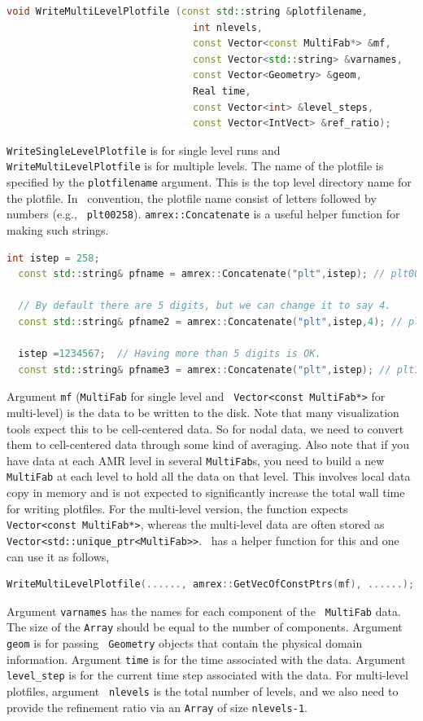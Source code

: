 {{\begin{lstlisting}[language=cpp]
  void WriteMultiLevelPlotfile (const std::string &plotfilename,
                                int nlevels,
                                const Vector<const MultiFab*> &mf,
                                const Vector<std::string> &varnames,
                                const Vector<Geometry> &geom,
                                Real time,
                                const Vector<int> &level_steps,
                                const Vector<IntVect> &ref_ratio);
\end{lstlisting}
{\tt WriteSingleLevelPlotfile} is for single level runs and {\tt
WriteMultiLevelPlotfile} is for multiple levels.  The name of the
plotfile is specified by the {\tt plotfilename} argument.  This is the
top level directory name for the plotfile.  In \amrex\ convention, the
plotfile name consist of letters followed by numbers (e.g., {\tt
plt00258}).  {\tt amrex::Concatenate} is a useful helper function for
making such strings.
\begin{lstlisting}[language=cpp]
  int istep = 258;
  const std::string& pfname = amrex::Concatenate("plt",istep); // plt00258

  // By default there are 5 digits, but we can change it to say 4.
  const std::string& pfname2 = amrex::Concatenate("plt",istep,4); // plt0258  

  istep =1234567;  // Having more than 5 digits is OK.
  const std::string& pfname3 = amrex::Concatenate("plt",istep); // plt12344567
\end{lstlisting}
Argument {\tt mf} ({\tt MultiFab} for single level and {\tt
  Vector<const MultiFab*>} for multi-level) is the data to be written
to the disk.  Note that many visualization tools expect this to be
cell-centered data.  So for nodal data, we need to convert them to
cell-centered data through some kind of averaging.  Also note that if
you have data at each AMR level in several {\tt MultiFab}s, you need
to build a new {\tt MultiFab} at each level to hold all the data on
that level.  This involves local data copy in memory and is not
expected to significantly increase the total wall time for writing
plotfiles.  For the multi-level version, the function expects {\tt
  Vector<const MultiFab*>}, whereas the multi-level data are often
stored as {\tt Vector<std::unique\_ptr<MultiFab>>}.  \amrex\ has a
helper function for this and one can use it as follows,
\begin{lstlisting}[language=cpp]
   WriteMultiLevelPlotfile(......, amrex::GetVecOfConstPtrs(mf), ......);
\end{lstlisting}
Argument {\tt varnames} has the names for each component of the {\tt
MultiFab} data.  The size of the {\tt Array} should be equal to the
number of components.  Argument {\tt geom} is for passing {\tt
Geometry} objects that contain the physical domain
information. Argument {\tt time} is for the time associated with the
data.  Argument {\tt level\_step} is for the current time step
associated with the data.  For multi-level plotfiles, argument {\tt
nlevels} is the total number of levels, and we also need to provide
the refinement ratio via an {\tt Array} of size {\tt nlevels-1}.

}}
